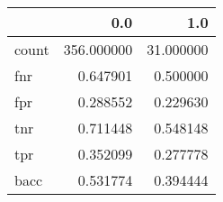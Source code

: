 \begin{tabular}{lrr}
\toprule
{} &         0.0 &        1.0 \\
\midrule
count &  356.000000 &  31.000000 \\
fnr   &    0.647901 &   0.500000 \\
fpr   &    0.288552 &   0.229630 \\
tnr   &    0.711448 &   0.548148 \\
tpr   &    0.352099 &   0.277778 \\
bacc  &    0.531774 &   0.394444 \\
\bottomrule
\end{tabular}
